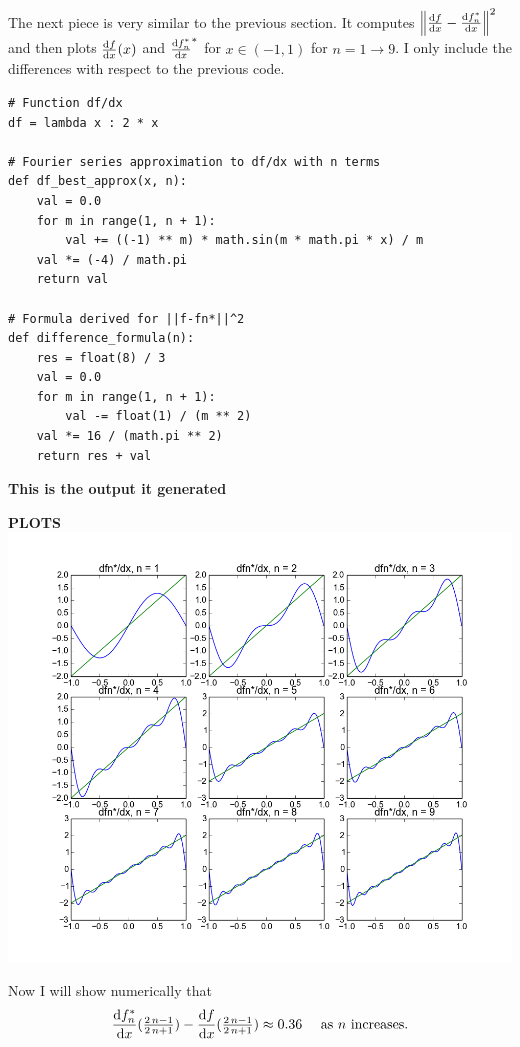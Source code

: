 \documentclass[12pt]{article}
\newcommand{\dfdx}{\frac{{\rm d}f}{{\rm d}x}}
\newcommand{\dfstardx}{\frac{{\rm d}f_n^*}{{\rm d}x}}
\newcommand{\norm}[1]{\left\|#1\right\|}
\begin{document}
The next piece is very similar to the previous section. It computes $\norm{\dfdx - \dfstardx}^2$ and then plots $\dfdx(x)$ and $\dfstardx^*$ for $x \in (-1, 1)$ for $n = 1 \rightarrow 9$. I only include the differences with respect to the previous code.\\

\begin{lstlisting}
# Function df/dx
df = lambda x : 2 * x

# Fourier series approximation to df/dx with n terms
def df_best_approx(x, n):
    val = 0.0
    for m in range(1, n + 1):
        val += ((-1) ** m) * math.sin(m * math.pi * x) / m
    val *= (-4) / math.pi
    return val

# Formula derived for ||f-fn*||^2
def difference_formula(n):
    res = float(8) / 3 
    val = 0.0
    for m in range(1, n + 1):
        val -= float(1) / (m ** 2)
    val *= 16 / (math.pi ** 2)
    return res + val
\end{lstlisting}

\textbf{This is the output it generated}

\clearpage
\textbf{PLOTS}\\

\hspace{-3em}
\includegraphics[scale=0.75]{graphsdf.png}

Now I will show numerically that
\begin{align*}
\dfstardx(\textstyle\frac{2\,n-1}{2\,n+1})-
\displaystyle
\dfdx(\textstyle\frac{2\,n-1}{2\,n+1}) 
\approx 0.36 \quad \mbox{ as $n$ increases}.
\end{align*}
\end{document}
